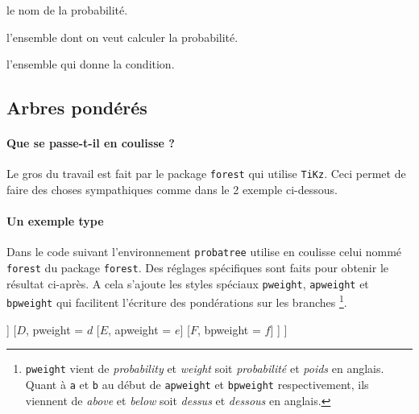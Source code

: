 \documentclass[12pt,a4paper]{article}
\theoremstyle{definition}
\begin{document}


 le nom de la probabilité.

 l'ensemble dont on veut calculer la probabilité.

 l'ensemble qui donne la condition.





\subsection{Arbres pondérés}

\paragraph{Que se passe-t-il en coulisse ?}

Le gros du travail est fait par le package \verb+forest+ qui utilise \verb+TiKz+. Ceci permet de faire des choses sympathiques comme dans le 2\ieme{} exemple ci-dessous.


\paragraph{Un exemple type}

Dans le code suivant l'environnement \verb+probatree+ utilise en coulisse celui nommé \verb+forest+ du package \verb+forest+. Des réglages spécifiques sont faits pour obtenir le résultat ci-après. A cela s'ajoute les styles spéciaux \verb+pweight+, \verb+apweight+ et \verb+bpweight+ qui facilitent l'écriture des pondérations sur les branches
\footnote{
    \texttt{pweight} vient de \emph{\og probability \fg} et \emph{\og weight\fg} soit \emph{\og probabilité \fg} et \emph{\og poids\fg} en anglais.
    Quant à \texttt{a} et \texttt{b} au début de \texttt{apweight} et \texttt{bpweight} respectivement, ils viennent de \emph{\og above \fg} et \emph{\og below\fg} soit \emph{\og dessus \fg} et \emph{\og dessous\fg} en anglais.
}.

\begin{tcblisting}{}
\begin{probatree}
[
    [$A$, pweight = $a$
        [$B$, pweight = $b$]
        [$C$, pweight = $c$]
    ]
    [$D$, pweight = $d$
        [$E$, apweight = $e$]
        [$F$, bpweight = $f$]
    ]
]
\end{probatree}
\end{tcblisting}
\end{document}

